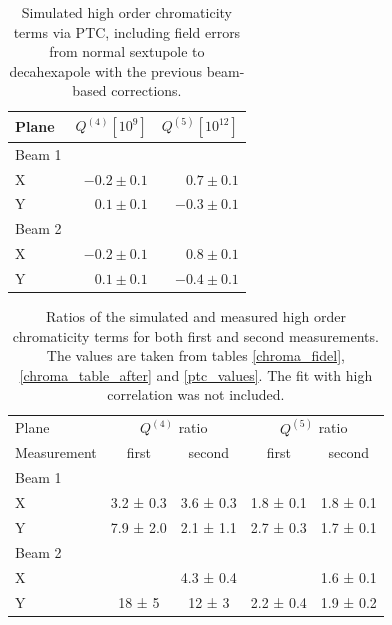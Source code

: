 \begin{table}[!htb]
    \centering
    \begin{tabular}{lrr}
    \toprule
        Plane     &  $Q^{(4)} [10^9]$  &  $Q^{(5)} [10^{12}]$ \\
    \midrule
        Beam 1    &              &               \\
        \hspace{2mm}X         & $-0.2 \pm 0.1$ & $ 0.7 \pm 0.1$ \\
        \hspace{2mm}Y         & $ 0.1 \pm 0.1$ & $-0.3 \pm 0.1$  \\
        Beam 2    &  &   \\
        \hspace{2mm}X         & $-0.2 \pm 0.1$ & $ 0.8 \pm 0.1$  \\
        \hspace{2mm}Y         & $ 0.1 \pm 0.1$ & $-0.4 \pm 0.1$ \\
    \bottomrule
    \end{tabular}
    \caption{Simulated high order chromaticity terms via PTC, including field errors from normal
    sextupole to decahexapole with the previous beam-based corrections.}
    \label{tab:high_orders:ptc_values}
  \end{table}

\begin{table}[!htb]
    \centering
    \footnotesize
    \begin{tabular}{|l||c|c|c|c|}
    \hline
        Plane     &  \multicolumn{2}{c|}{$Q^{(4)}$ ratio}   &  \multicolumn{2}{c|}{$Q^{(5)}$ ratio} \\
        \cline{2-5}
        Measurement &   first    &    second   &    first   &    second\\ \hline\hline
        Beam 1    &              &             &            & \\
        X         &  3.2 ± 0.3   & 3.6 ± 0.3  & 1.8 ± 0.1  & 1.8 ± 0.1  \\
        Y         &  7.9 ± 2.0   & 2.1 ± 1.1   & 2.7 ± 0.3  & 1.7 ± 0.1  \\ \hline
        Beam 2    &              &             &            & \\ 
        X         &              & 4.3 ± 0.4   &            & 1.6 ± 0.1  \\
        Y         &  18 ± 5      & 12 ± 3      & 2.2 ± 0.4  & 1.9 ± 0.2 \\ \hline
    \end{tabular}
    \caption{Ratios of the simulated and measured high order chromaticity terms for both first and
    second measurements.  The values are taken from tables \ref{chroma_fidel},
    \ref{chroma_table_after} and \ref{ptc_values}. The fit with high correlation was not included.}
    \label{ptc_values_ratios}
\end{table}

